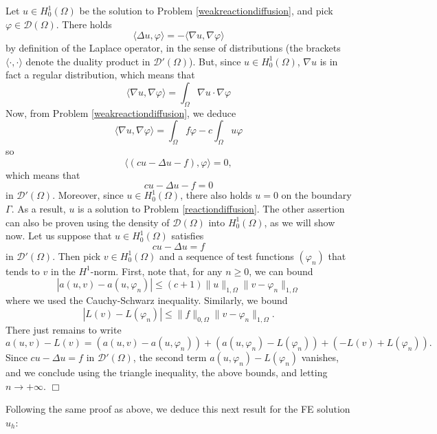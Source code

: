 \documentclass{article}
\begin{document}
 Let $u \in H^1_0(\Omega)$ be the solution to Problem \eqref{weakreactiondiffusion}, and pick
$\varphi \in \mathcal{D}(\Omega)$.
There holds
\[
\langle \Delta u , \varphi \rangle
= - \langle \nabla u , \nabla \varphi \rangle
\]
by definition of the Laplace operator, in the sense of distributions (the brackets $\langle \cdot , \cdot \rangle$ denote the duality product in $\mathcal{D}'(\Omega)$). But, since $u \in H^1_0(\Omega)$, $\nabla u$ is in fact a regular distribution, which means that
\[
\langle \nabla u , \nabla \varphi \rangle
=
\int_\Omega \nabla u \cdot \nabla \varphi
\]
Now, from Problem \eqref{weakreactiondiffusion}, we deduce
\[
\langle \nabla u , \nabla \varphi \rangle
=
\int_\Omega f \varphi
- c
\int_\Omega u \varphi
\]
so
\[
\langle 
\left ( c u - \Delta u - f \right ) , \varphi \rangle = 0,
\]
which means that
\[
c u - \Delta u - f = 0
\]
in $\mathcal{D}'(\Omega)$. Moreover, since $u \in H^1_0(\Omega)$, there also holds $u=0$ on the boundary $\Gamma$. As a result, $u$ is a solution to Problem \eqref{reactiondiffusion}. 
The other assertion can also be proven using the density of $\mathcal{D}(\Omega)$ into $H^1_0(\Omega)$, as we will show now. Let us suppose that $u\in H^1_0(\Omega)$ satisfies 
\[
c u - \Delta u = f
\]
in $\mathcal{D}'(\Omega)$. Then pick $v \in H^1_0(\Omega)$ and a sequence of test functions $(\varphi_n)$ that tends to $v$ in the $H^1$-norm. First, note that, for any $n\geq 0$, we can bound
\[
| a ( u , v) - a ( u , \varphi_n ) |
\leq 
( c + 1 ) \| u \|_{1, \Omega} \| v - \varphi_n \|_{1,\Omega}
\]
where we used the Cauchy-Schwarz inequality. Similarly, we bound
\[
| L (v) - L ( \varphi_n ) |
\leq 
\| f \|_{0, \Omega} \| v - \varphi_n \|_{1,\Omega}.
\]
There just remains to write
\[
a ( u , v ) - L (v ) =
( a ( u , v) - a ( u , \varphi_n ) ) 
+
( a ( u , \varphi_n ) - L ( \varphi_n ) )
+
( - L ( v ) + L ( \varphi_n ) ).
\]
Since $c u - \Delta u = f$ in $\mathcal{D}'(\Omega)$, the second term $a ( u , \varphi_n ) - L ( \varphi_n )$ vanishes, and we conclude using the triangle inequality, the above bounds, and letting $n \rightarrow +\infty$.
$\Box$

\medskip

Following the same proof as above, we deduce this next result for the FE solution $u_h$:
\end{document}
